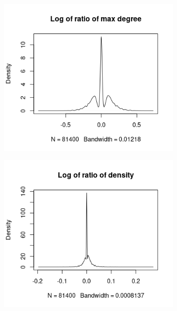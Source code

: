 \documentclass{l4proj}
\theoremstyle{definition}
\theoremstyle{remark}
\begin{document}
\begin{appendices}
\begin{figure}
\begin{subfigure}[t]{0.49\textwidth}
    \end{subfigure}
    \begin{subfigure}[t]{0.49\textwidth}
      \centering
      \includegraphics[width=\textwidth]{images/mcs_ratio_maxdeg.png}
    \end{subfigure}
    \begin{subfigure}[t]{0.49\textwidth}
      \centering
      \includegraphics[width=\textwidth]{images/mcs_ratio_density.png}
    \end{subfigure}

\end{figure}
\end{appendices}
\end{document}
